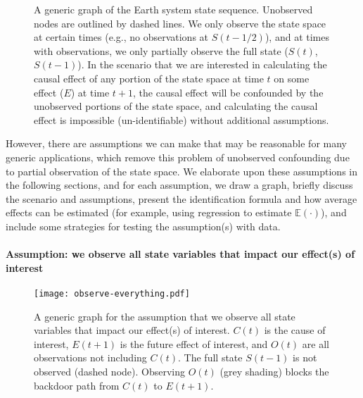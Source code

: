 \documentclass[12pt]{article}
\begin{document}
\begin{figure} 
  \caption{A generic graph of the Earth system state
    sequence. Unobserved nodes are outlined by dashed lines. We only
    observe the state space at certain times (e.g., no observations at
    $S(t-1/2)$), and at times with observations, we only partially
    observe the full state ($S(t)$, $S(t-1)$). In the scenario that we
    are interested in calculating the causal effect of any portion of
    the state space at time $t$ on some effect ($E$) at time $t+1$,
    the causal effect will be confounded by the unobserved portions of
    the state space, and calculating the causal effect is impossible
    (un-identifiable) without additional assumptions.}
  \label{fig:generic}
\end{figure}

However, there are assumptions we can make that may be reasonable for
many generic applications, which remove this problem of unobserved
confounding due to partial observation of the state space. We
elaborate upon these assumptions in the following sections, and for
each assumption, we draw a graph, briefly discuss the scenario and
assumptions, present the identification formula and how average
effects can be estimated (for example, using regression to estimate
$\mathbb{E}(\cdot )$), and include some strategies for testing the
assumption(s) with data.

\paragraph{Assumption: we observe all state variables that impact our effect(s) of interest}

\begin{figure}[H]
  \texttt{[image: observe-everything.pdf]}
  \caption{A generic graph for the assumption that we observe all
    state variables that impact our effect(s) of interest. $C(t)$ is
    the cause of interest, $E(t+1)$ is the future effect of interest,
    and $O(t)$ are all observations not including $C(t)$. The full
    state $S(t-1)$ is not observed (dashed node). Observing $O(t)$
    (grey shading) blocks the backdoor path from $C(t)$ to $E(t+1)$.}
  \label{fig:observe-everything}
\end{figure}
\end{document}
